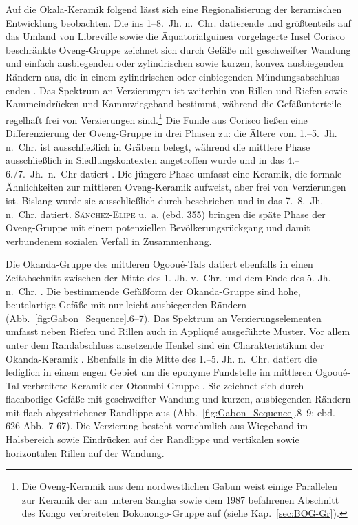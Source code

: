 Auf die Okala-Keramik folgend lässt sich eine Regionalisierung der keramischen Entwicklung beobachten. Die ins 1--8.~Jh. n.~Chr. datierende und größtenteils auf das Umland von Libreville \parencite[615--618]{Clist.20042005} sowie die Äquatorialguinea vorgelagerte Insel Corisco \parencites{GonzalezRuibal.2011}{GonzalesRuibal.2012}{SanchezElipe.2015}{SanchezElipe.2016} beschränkte Oveng-Gruppe zeichnet sich durch Gefäße mit geschweifter Wandung und einfach ausbiegenden oder zylindrischen sowie kurzen, konvex ausbiegenden Rändern aus, die in einem zylindrischen oder einbiegenden Mündungsabschluss enden \parencites[Abb.~\ref{fig:Gabon_Sequence}.4--5;][559 Abb.~7-18]{Clist.20042005}[134 Abb.~15]{GonzalesRuibal.2012}. Das Spektrum an Verzierungen ist weiterhin von Rillen und Riefen sowie Kammeindrücken und Kammwiegeband bestimmt, während die Gefäßunterteile regelhaft frei von Verzierungen sind.\footnote{Die Oveng-Keramik aus dem nordwestlichen Gabun weist einige Parallelen zur Keramik der am unteren \mbox{Sangha} sowie dem 1987 befahrenen Abschnitt des Kongo verbreiteten Bokonongo-Gruppe auf (siehe Kap.~\ref{sec:BOG-Gr}).} Die Funde aus Corisco ließen eine Differenzierung der Oveng-Gruppe in drei Phasen zu: die Ältere vom 1.--5.~Jh. n.~Chr. ist ausschließlich in Gräbern belegt, während die mittlere Phase ausschließlich in Siedlungskontexten angetroffen wurde und in das 4.--6./7.~Jh.~n.~Chr datiert \parencites{SanchezElipe.2015}[354]{SanchezElipe.2016}. Die jüngere Phase umfasst eine Keramik, die formale Ähnlichkeiten zur mittleren Oveng-Keramik aufweist, aber frei von Verzierungen ist. Bislang wurde sie ausschließlich durch \textcites{SanchezElipe.2016} beschrieben und in das 7.--8.~Jh. n.~Chr. datiert. \textsc{Sánchez-Elipe} u.~a. (ebd. 355) bringen die späte Phase der Oveng-Gruppe mit einem potenziellen Bevölkerungsrückgang und damit verbundenem sozialen Verfall in Zusammenhang.

Die Okanda-Gruppe des mittleren Ogooué-Tals datiert ebenfalls in einen Zeitabschnitt zwischen der Mitte des 1. Jh. v.~Chr. und dem Ende des 5. Jh. n.~Chr. \parencite[619--622]{Clist.20042005}. Die bestimmende Gefäßform der Okanda-Gruppe sind hohe, beutelartige Gefäße mit nur leicht ausbiegenden Rändern (Abb.~\ref{fig:Gabon_Sequence}.6--7). Das Spektrum an Verzierungselementen umfasst neben Riefen und Rillen auch in Appliqué ausgeführte Muster. Vor allem unter dem Randabschluss ansetzende Henkel sind ein Charakteristikum der Okanda-Keramik \parencite[100 Abb.~6]{Oslisly.1998}. Ebenfalls in die Mitte des 1.--5. Jh. n.~Chr. datiert die lediglich in einem engen Gebiet um die eponyme Fundstelle im mittleren Ogooué-Tal verbreitete Keramik der Otoumbi-Gruppe \parencite[623--625]{Clist.20042005}. Sie zeichnet sich durch flachbodige Gefäße mit geschweifter Wandung und kurzen, ausbiegenden Rändern mit flach abgestrichener Randlippe aus (Abb.~\ref{fig:Gabon_Sequence}.8--9; ebd. 626 Abb.~7-67). Die Verzierung besteht vornehmlich aus Wiegeband im Halsbereich sowie Eindrücken auf der Randlippe und vertikalen sowie horizontalen Rillen auf der Wandung.

